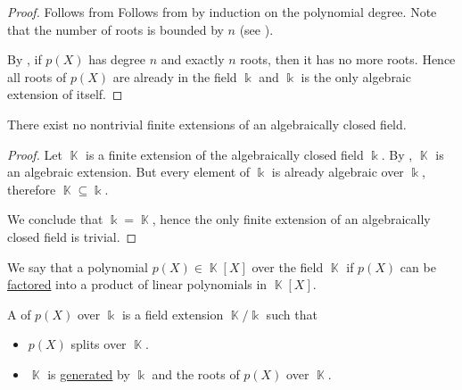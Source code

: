 \begin{proof}
   Follows from  Follows from  by induction on the polynomial degree. Note that the number of roots is bounded by \( n \) (see ).

   By , if \( p(X) \) has degree \( n \) and exactly \( n \) roots, then it has no more roots. Hence all roots of \( p(X) \) are already in the field \( \Bbbk \) and \( \Bbbk \) is the only algebraic extension of itself.
\end{proof}

\begin{proposition}\label{thm:no_finite_extensions_of_closed_fields}
  There exist no nontrivial finite extensions of an algebraically closed field.
\end{proposition}
\begin{proof}
  Let \( \BbbK \) is a finite extension of the algebraically closed field \( \Bbbk \). By , \( \BbbK \) is an algebraic extension. But every element of \( \Bbbk \) is already algebraic over \( \Bbbk \), therefore \( \BbbK \subseteq \Bbbk \).

  We conclude that \( \Bbbk = \BbbK \), hence the only finite extension of an algebraically closed field is trivial.
\end{proof}

\begin{definition}\label{def:splitting_field}
  We say that a polynomial \( p(X) \in \BbbK[X] \) over the field \( \BbbK \)  if \( p(X) \) can be \hyperref[def:factorization_in_ring]{factored} into a product of linear polynomials in \( \BbbK[X] \).

  A  of \( p(X) \) over \( \Bbbk \) is a field extension \( \BbbK / \Bbbk \) such that
  \begin{itemize}
    \item \( p(X) \) splits over \( \BbbK \).
    \item \( \BbbK \) is \hyperref[def:generated_ring_ideal]{generated} by \( \Bbbk \) and the roots of \( p(X) \) over \( \BbbK \).
  \end{itemize}
\end{definition}

